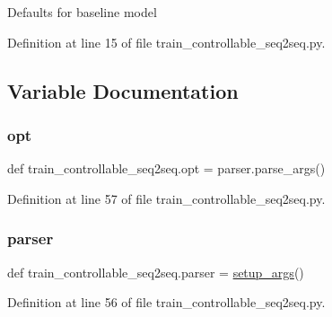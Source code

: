 \begin{DoxyVerb}Defaults for baseline model\end{DoxyVerb}
 

Definition at line 15 of file train\+\_\+controllable\+\_\+seq2seq.\+py.



\subsection{Variable Documentation}
\mbox{\label{namespacetrain__controllable__seq2seq_ae13118765a317be1b58b2c0af610def7}} 
\subsubsection{\texorpdfstring{opt}{opt}}
{\footnotesize\ttfamily def train\+\_\+controllable\+\_\+seq2seq.\+opt = parser.\+parse\+\_\+args()}



Definition at line 57 of file train\+\_\+controllable\+\_\+seq2seq.\+py.

\mbox{\label{namespacetrain__controllable__seq2seq_a8f25ecefcc690c1407b6bac556c8ab13}} 
\subsubsection{\texorpdfstring{parser}{parser}}
{\footnotesize\ttfamily def train\+\_\+controllable\+\_\+seq2seq.\+parser = \hyperlink{namespacetrain__controllable__seq2seq_a4afda2353930467d7f816e6e0f774d99}{setup\+\_\+args}()}



Definition at line 56 of file train\+\_\+controllable\+\_\+seq2seq.\+py.

